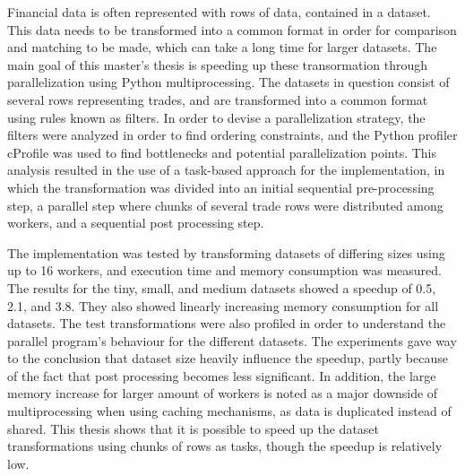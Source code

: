 Financial data is often represented with rows of data, contained in a dataset. This data needs to be transformed into a common format in order for
comparison and matching to be made, which can take a long time for larger datasets.
The main goal of this master’s thesis is speeding up these transormation through parallelization using Python multiprocessing.
The datasets in question consist of several rows representing trades, and are transformed into a common format using rules known as filters. In order to devise a
parallelization strategy, the filters were analyzed in order to find ordering constraints, and the Python profiler cProfile was used to find bottlenecks
and potential parallelization points. This analysis resulted in the use of a task-based approach for the implementation, in which the transformation
was divided into an initial sequential pre-processing step, a parallel step where chunks of several trade rows were distributed among workers, and a
sequential post processing step. 

The implementation was tested by transforming datasets of differing sizes using up to 16 workers, and execution time and memory consumption
was measured. The results for the tiny, small, and medium datasets showed a speedup of 0.5, 2.1, and 3.8. They also showed linearly increasing
memory consumption for all datasets.  The test transformations were also profiled in order to understand the parallel program’s behaviour for the
different datasets. The experiments gave way to the conclusion that dataset size heavily influence the speedup, partly because of the fact that
post processing becomes less significant.  In addition, the large memory increase for larger amount of workers is noted as a major downside of
multiprocessing when using caching mechanisms, as data is duplicated instead of shared. This thesis shows that it is possible to speed up the
dataset transformations using chunks of rows as tasks, though the speedup is relatively low.
